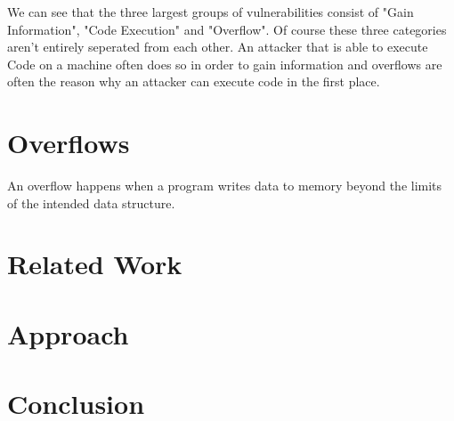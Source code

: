 \documentclass[10pt,twocolumn,a4paper]{article}
\begin{document}
We can see that the three largest groups of vulnerabilities consist of "Gain Information", "Code Execution" and "Overflow".
Of course these three categories aren't entirely seperated from each other.
An attacker that is able to execute Code on a machine often does so in order to gain information and overflows are often the reason why an attacker can execute code in the first place.
\section{Overflows}\label{sec:Overflows}
An overflow happens when a program writes data to memory beyond the limits of the intended data structure.





\section{Related Work}\label{sec:relwork} 

\section{Approach}

\section{Conclusion}\label{sec:conclusion}



\end{document}
